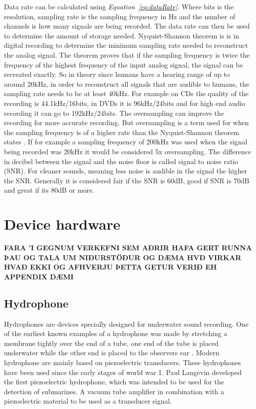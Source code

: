Data rate can be calculated using \textit{Equation~\ref{eq:dataRate}}.
Where bits is the resolution, sampling rate is the sampling frequency in Hz and the number of channels is how many signals are being recorded.
The data rate can then be used to determine the amount of storage needed.
Nyquist-Shannon theorem is is in digital recording to determine the minimum sampling rate needed to reconstruct the analog signal.
The theorem proves that if the sampling frequency is twice the frequency of the highest frequency of the input analog signal, the signal can be recreated exactly.%
So in theory since humans have a hearing range of up to around 20kHz, in order to reconstruct all signals that are audible to humans, the sampling rate needs to be at least 40kHz.
For example on CDs the quality of the recording is 44.1kHz/16bits, in DVDs it is 96kHz/24bits and for high end audio recording it can go to 192kHz/24bits.
The oversampling can improve the recording for more accurate recording.
But oversampling is a term used for when the sampling frequency is of a higher rate than the Nyquist-Shannon theorem states  \cite{bartlett_practical_2016}.
If for example a sampling frequency of 200kHz was used when the signal being recorded was 20kHz it would be considered 5x oversampling. 
The difference in decibel between the signal and the noise floor is called signal to noise ratio (SNR). 
For cleaner sounds, meaning less noise is audible in the signal the higher the SNR.
Generally it is considered fair if the SNR is 60dB, good if SNR is 70dB and great if its 80dB or more.
\cite{bartlett_practical_2016}

\section{Device hardware}

\textbf{FARA 'I GEGNUM VERKEFNI SEM AÐRIR HAFA GERT RUNNA ÞAU OG TALA UM NIÐURSTÖÐUR OG DÆMA HVÐ VIRKAR HVAÐ EKKI OG AFHVERJU ÞETTA GETUR VERIÐ EH APPENDIX DÆMI
}

\subsection{Hydrophone}

Hydrophones are devices specially designed for underwater sound recording.
One of the earliest known examples of a hydrophone was made by stretching a membrane tightly over the end of a tube, one end of the tube is placed underwater while the other end is placed to the observers ear \cite{wood_a_b_textbook_1946}. 
Modern hydrophone are mainly based on piezoelectric transducers.
These hydrophones have been used since the early stages of world war 1.
Paul Langevin developed the first piezoelectric hydrophone, which was intended to be used for the detection of submarines.
A vacuum tube amplifier in combination with a piezoelectric material to be used as a transducer signal\cite{van_der_kloot_great_2014}.


